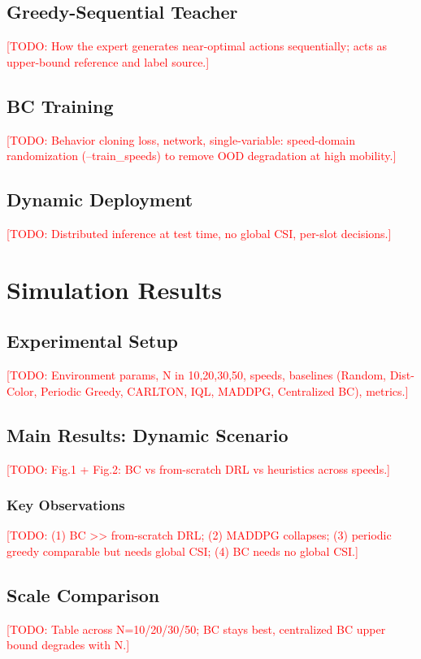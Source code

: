 \documentclass[journal]{IEEEtran}
\newcommand{\todo}[1]{\textcolor{red}{[TODO: #1]}}
\begin{document}
\subsection{Greedy-Sequential Teacher}
\todo{How the expert generates near-optimal actions sequentially; acts as
upper-bound reference and label source.}

\subsection{BC Training}
\todo{Behavior cloning loss, network, single-variable: speed-domain
randomization (--train_speeds) to remove OOD degradation at high mobility.}

\subsection{Dynamic Deployment}
\todo{Distributed inference at test time, no global CSI, per-slot decisions.}

\section{Simulation Results}
\label{sec:results}

\subsection{Experimental Setup}
\todo{Environment params, N in {10,20,30,50}, speeds, baselines (Random,
Dist-Color, Periodic Greedy, CARLTON, IQL, MADDPG, Centralized BC), metrics.}

\subsection{Main Results: Dynamic Scenario}
\todo{Fig.1 + Fig.2: BC vs from-scratch DRL vs heuristics across speeds.}
\subsubsection{Key Observations}
\todo{(1) BC >> from-scratch DRL; (2) MADDPG collapses; (3) periodic greedy
comparable but needs global CSI; (4) BC needs no global CSI.}

\subsection{Scale Comparison}
\todo{Table across N=10/20/30/50; BC stays best, centralized BC upper bound
degrades with N.}
\end{document}
